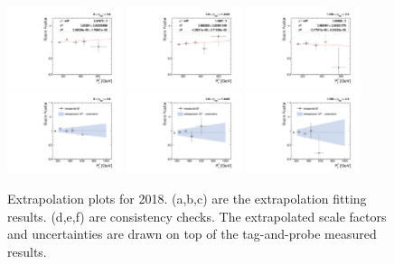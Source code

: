 \begin{figure}[!htbp]
  \centering
   \caption{Extrapolation plots for 2018. (a,b,c) are the extrapolation fitting results. (d,e,f) are consistency checks. The extrapolated scale factors and uncertainties are drawn on top of the tag-and-probe measured results.}
  \includegraphics[width=0.3\textwidth]{fig/Extrapolate_2018_0_Fit.pdf}
  \includegraphics[width=0.3\textwidth]{fig/Extrapolate_2018_1_Fit.pdf}
  \includegraphics[width=0.3\textwidth]{fig/Extrapolate_2018_2_Fit.pdf}\\
  \includegraphics[width=0.3\textwidth]{fig/Extrapolate_2018_0_Check.pdf}
  \includegraphics[width=0.3\textwidth]{fig/Extrapolate_2018_1_Check.pdf}
  \includegraphics[width=0.3\textwidth]{fig/Extrapolate_2018_2_Check.pdf}\\

\end{figure}
